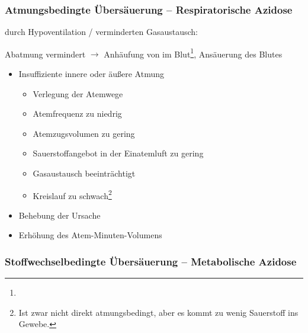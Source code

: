 \subsubsection{Atmungsbedingte Übersäuerung --
Respiratorische Azidose}
\label{bkm:RefHeading35233321}\label{topic:azidose-respiratorische}durch Hypoventilation / verminderten  Gasaustausch:

  Abatmung vermindert ${\rightarrow}$ Anhäufung von
 im Blut\footnote{}, Ansäuerung des
Blutes


{

\begin{itemize}
  \item Insuffiziente innere oder äußere Atmung
  \begin{itemize}
    \item Verlegung der Atemwege
    \item Atemfrequenz zu niedrig
    \item Atemzugsvolumen zu gering
    \item Sauerstoffangebot in der Einatemluft zu gering
    \item Gasaustausch beeinträchtigt
    \item Kreislauf zu schwach\footnote{Ist zwar nicht
    direkt atmungsbedingt, aber es kommt zu wenig
    Sauerstoff ins Gewebe.}
  \end{itemize}
\end{itemize}
}{}{}{}{}

{}{

\begin{itemize}
    \item Behebung der Ursache
    \item Erhöhung des Atem-Minuten-Volumens
\end{itemize}
}






\subsubsection{Stoffwechselbedingte Übersäuerung
-- Metabolische Azidose} 
\label{topic:azidose-metabolische}

